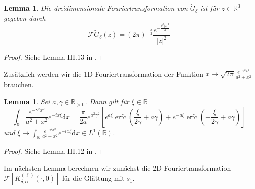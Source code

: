 \documentclass[12pt,a4paper]{scrartcl}
\newtheorem{Lemma}[Satz]{Lemma}
\newcommand{\dd}{\mathrm{d}}
\numberwithin{equation}{section}
\newcommand{\R}{\mathbb{R}} %
\newcommand{\F}{\mathcal{F}} %
\newcommand{\erfc}{\operatorname{erfc}}
\begin{document}
\begin{Lemma} \label{LFGdelta}
Die dreidimensionale Fouriertransformation von $\widetilde G_\delta$ ist für $z\in \R^3$ gegeben durch
\[
\F \widetilde G_\delta(z)= (2 \pi)^{-\frac{3}{2}}\frac{e^{-\frac{\delta^2 |z|^2}{4}}}{|z|^2}
\]
\end{Lemma}
\begin{proof}
Siehe Lemma III.13 in \cite{Collet}.
\end{proof}
Zusätzlich werden wir die 1D-Fouriertransformation der Funktion $x \mapsto \sqrt{2\pi}\frac{e^{-\gamma^2 x^2}}{a^2+x^2}$ brauchen.
\begin{Lemma}\label{LFGdelta2}
Sei $a,\gamma \in \R_{>0}$. Dann gilt für $\xi \in \R$
\[
\int_\R \frac{e^{-\gamma^2 x^2}}{a^2+x^2}e^{-ix \xi} \dd x = \frac{\pi}{2a}e^{a^2 \gamma^2} 
\left[e^{a\xi} \erfc\left(\frac{\xi}{2 \gamma}+a \gamma \right) + e^{-a \xi} \erfc \left( -\frac{\xi}{2 \gamma}+a \gamma \right)
\right]
\]
und $\xi \mapsto \int_\R \frac{e^{-\gamma^2 x^2}}{a^2+x^2}e^{-ix \xi} \dd x \in L^1(\R)$.
\end{Lemma}
\begin{proof}
Siehe Lemma III.12 in \cite{Collet}.
\end{proof}
Im nächsten Lemma berechnen wir zunächst die 2D-Fouriertransformation $\F [K_{\delta,\alpha}^{(\ell)}(\cdot,0)]$ für die Glättung mit $s_1$.
\end{document}
